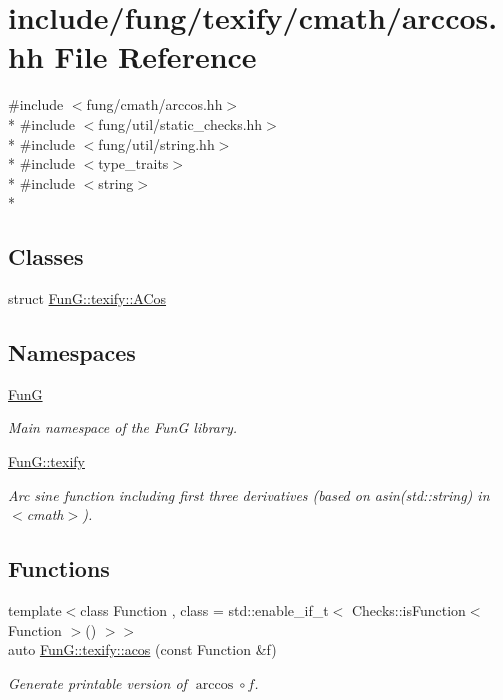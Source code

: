 \hypertarget{texify_2cmath_2arccos_8hh}{\section{include/fung/texify/cmath/arccos.hh File Reference}
\label{texify_2cmath_2arccos_8hh}
}
{\ttfamily \#include $<$fung/cmath/arccos.\-hh$>$}\\*
{\ttfamily \#include $<$fung/util/static\-\_\-checks.\-hh$>$}\\*
{\ttfamily \#include $<$fung/util/string.\-hh$>$}\\*
{\ttfamily \#include $<$type\-\_\-traits$>$}\\*
{\ttfamily \#include $<$string$>$}\\*
\subsection*{Classes}
\begin{DoxyCompactItemize}
\item 
struct \hyperlink{structFunG_1_1texify_1_1ACos}{Fun\-G\-::texify\-::\-A\-Cos}
\end{DoxyCompactItemize}
\subsection*{Namespaces}
\begin{DoxyCompactItemize}
\item 
\hyperlink{namespaceFunG}{Fun\-G}
\begin{DoxyCompactList}\small\item\em Main namespace of the Fun\-G library. \end{DoxyCompactList}\item 
\hyperlink{namespaceFunG_1_1texify}{Fun\-G\-::texify}
\begin{DoxyCompactList}\small\item\em Arc sine function including first three derivatives (based on asin(std\-::string) in $<$cmath$>$). \end{DoxyCompactList}\end{DoxyCompactItemize}
\subsection*{Functions}
\begin{DoxyCompactItemize}
\item 
{\footnotesize template$<$class Function , class  = std\-::enable\-\_\-if\-\_\-t$<$ Checks\-::is\-Function$<$ Function $>$() $>$$>$ }\\auto \hyperlink{group__TexifyCMathGroup_ga25006ed8aa960202cb697a70cd177070}{Fun\-G\-::texify\-::acos} (const Function \&f)
\begin{DoxyCompactList}\small\item\em Generate printable version of $ \arccos\circ f $. \end{DoxyCompactList}\end{DoxyCompactItemize}

